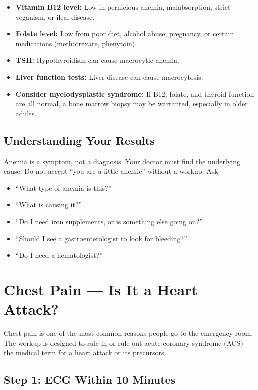 \begin{itemize}
    \item \textbf{Vitamin B12 level:} Low in pernicious anemia, malabsorption, strict veganism, or ileal disease.
    \item \textbf{Folate level:} Low from poor diet, alcohol abuse, pregnancy, or certain medications (methotrexate, phenytoin).
    \item \textbf{TSH:} Hypothyroidism can cause macrocytic anemia.
    \item \textbf{Liver function tests:} Liver disease can cause macrocytosis.
    \item \textbf{Consider myelodysplastic syndrome:} If B12, folate, and thyroid function are all normal, a bone marrow biopsy may be warranted, especially in older adults.
\end{itemize}

\subsection{Understanding Your Results}

Anemia is a symptom, not a diagnosis. Your doctor must find the underlying cause. Do not accept ``you are a little anemic'' without a workup. Ask:
\begin{itemize}
    \item ``What type of anemia is this?''
    \item ``What is causing it?''
    \item ``Do I need iron supplements, or is something else going on?''
    \item ``Should I see a gastroenterologist to look for bleeding?''
    \item ``Do I need a hematologist?''
\end{itemize}

\clearpage
\section{Chest Pain --- Is It a Heart Attack?}

Chest pain is one of the most common reasons people go to the emergency room. The workup is designed to rule in or rule out acute coronary syndrome (ACS) --- the medical term for a heart attack or its precursors.

\subsection{Step 1: ECG Within 10 Minutes}

